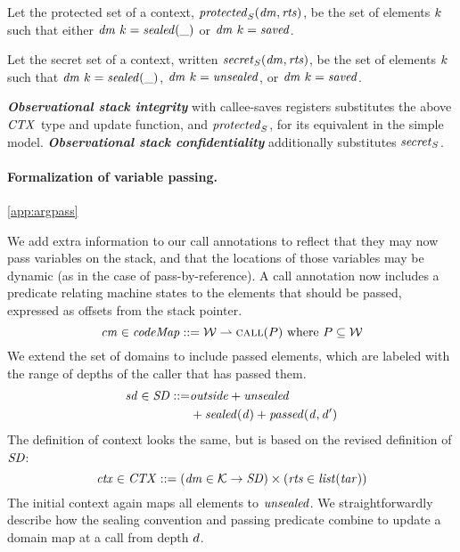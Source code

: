 \documentclass[10pt,conference]{ieeetran}%
\theoremstyle{definition}
\begin{document}
{ Let the protected set of a context, \(\mathit{protected}_S(\mathit{dm},\mathit{rts})\),
be the set of elements \(k\) such that either \(\mathit{dm} ~ k = \mathit{sealed(\relax{\_})}\)
or \(\mathit{dm} ~ k = \mathit{saved}\).

 Let the secret set of a context, written \(\mathit{secret}_S(\mathit{dm},\mathit{rts})\),
be the set of elements \(k\) such that
\(\mathit{dm} ~ k = \mathit{sealed(\relax{\_})}\), \(\mathit{dm} ~ k = \mathit{unsealed}\), or
\(\mathit{dm} ~ k = \mathit{saved}\).

%
\textbf{\em Observational stack integrity} with callee-saves registers substitutes the above
\(\mathit{CTX}\) type and update function, and \(\mathit{protected}_S\), for its equivalent in the simple model.
%
\textbf{\em Observational stack confidentiality} additionally substitutes \(\mathit{secret}_S\).

\paragraph*{Formalization of variable passing.}
\ref{app:argpass}

We add extra information to our call
annotations to reflect that they may now pass variables on the stack, and that the locations
of those variables may be dynamic (as in the case of pass-by-reference).
A call annotation now includes a predicate relating machine states to the elements
that should be passed, expressed as offsets from the stack pointer.
\[\mathit{cm} \in \mathit{codeMap} ::= {\mathcal W} \rightharpoonup \text{\sc call}(P)~\relax{\rm where}~P \subseteq {\mathcal W}\]
We extend the set of domains to include passed elements,
which are labeled with the range of depths of the caller that has passed them.
\[\begin{split}
\mathit{sd} \in \mathit{SD} ::= & \mathit{outside} + \mathit{unsealed}\\
& + \mathit{sealed(d)} + \mathit{passed(d,d')}
\end{split}\]
The definition of context looks the same, but is based on the revised definition of \(\mathit{SD}\):
\[\mathit{ctx} \in \mathit{CTX} ::= (\mathit{dm} \in {\mathcal K} \rightarrow \mathit{SD})
\times (\mathit{rts} \in \mathit{list} (\mathit{tar})) \]
The initial context again maps all elements to \(\mathit{unsealed}\).
We straightforwardly describe how the sealing convention and passing predicate combine to
update a domain map at a call from depth \(d\).

}
\end{document}
